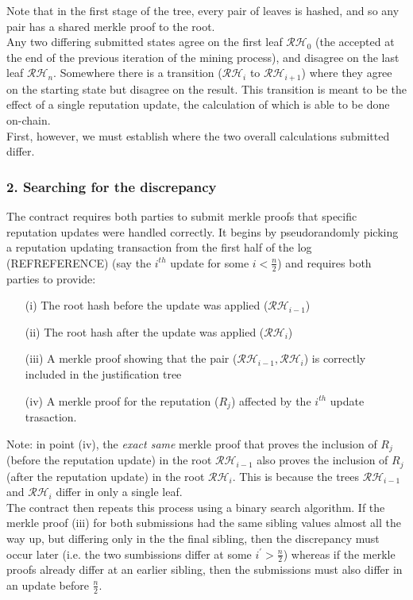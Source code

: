 Note that in the first stage of the tree, every pair of leaves is hashed, and so any pair has a shared merkle proof to the root.\\
Any two differing submitted states agree on the first leaf $\mathcal{RH}_0$ (the  accepted at the end of the previous iteration of the mining process), and disagree on the last leaf $\mathcal{RH}_n$. Somewhere there is a transition  ($\mathcal{RH}_i$ to $\mathcal{RH}_{i+1}$) where they agree on the starting state but disagree on the result. This transition is meant to be the effect of a single reputation update, the calculation of which is able to be done on-chain. \\
First, however, we must establish where the two overall calculations submitted differ.

\subsubsection*{2. Searching for the discrepancy}
The contract requires both parties to submit merkle proofs that specific reputation updates were handled correctly. It begins by pseudorandomly picking a reputation updating transaction from the first half of the log (REFREFERENCE) (say the $i^{th}$ update for some $i<\frac{n}{2}$) and requires both parties to provide:\\
\begin{itemize}
 \item[(i)] The root hash before the update was applied ($\mathcal{RH}_{i-1}$)
 \item[(ii)] The root hash after the update was applied ($\mathcal{RH}_i$)
 \item[(iii)] A merkle proof showing that the pair ($\mathcal{RH}_{i-1}, \mathcal{RH}_i$) is correctly included in the justification tree
 \item[(iv)] A merkle proof for the reputation ($R_j$) affected by the $i^{th}$ update trasaction.
\end{itemize}
Note: in point (iv), the \emph{exact same} merkle proof that proves the inclusion of $R_j$ (before the reputation update) in the root $\mathcal{RH}_{i-1}$ also proves the inclusion of $R_j$ (after the reputation update) in the root $\mathcal{RH}_i$. This is because the trees $\mathcal{RH}_{i-1}$ and $\mathcal{RH}_i$ differ in only a single leaf.\\

The contract then repeats this process using a binary search algorithm. If the merkle proof (iii) for both submissions had the same sibling values almost all the way up, but differing only in the the final sibling, then the discrepancy must occur later (i.e. the two sumbissions differ at some $i^\prime > \frac{n}{2}$) whereas if the merkle proofs already differ at an earlier sibling, then the submissions must also differ in an update before $\frac{n}{2}$.

